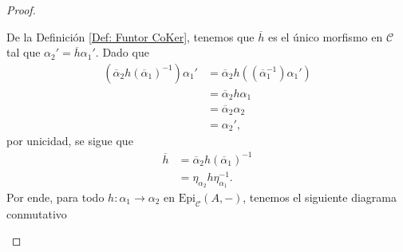 \documentclass[tesis]{subfiles}
\begin{document}
\begin{proof}
\begin{enumerate}[label=(\alph*)]
    De la Definición \ref{Def: Funtor CoKer}, tenemos que $\overline{h}$ es el único morfismo en $\mathscr{C}$ tal que $\alpha_2'=\overline{h}\alpha_1'$. Dado que
    \begin{align*}
        (\overline{\alpha}_2 h (\overline{\alpha}_1)^{-1})\alpha_1' &= \overline{\alpha}_2h((\overline{\alpha}_1^{-1})\alpha_1') \\
                                                                    &= \overline{\alpha}_2 h \alpha_1 \\
                                                                    &= \overline{\alpha}_2 \alpha_2 \\
                                                                    &= \alpha_2',
    \end{align*}
    por unicidad, se sigue que
    \begin{align*}
        \overline{h} &= \overline{\alpha}_2 h (\overline{\alpha}_1)^{-1} \\
                     &= \eta_{\alpha_2} h \eta_{\alpha_1}^{-1}.
    \end{align*}
    Por ende, para todo $h:\alpha_1\to \alpha_2$ en $\text{Epi}_\mathscr{C}(A,-)$, tenemos el siguiente diagrama conmutativo
    \begin{center}
    \end{center}
    \end{enumerate}
\end{proof}
\end{document}

